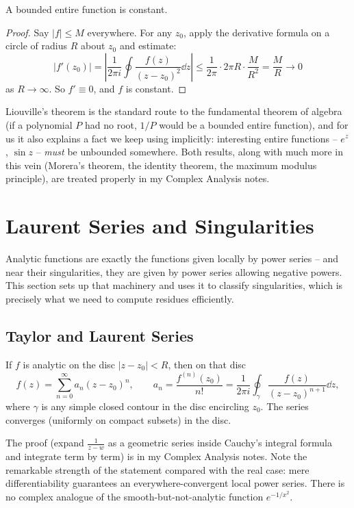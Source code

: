 \begin{theorem}
	A bounded entire function is constant.
\end{theorem}
\begin{proof}
	Say $|f| \leq M$ everywhere. For any $z_0$, apply the derivative formula on a circle of radius $R$ about $z_0$ and estimate:
	$$
	|f'(z_0)| = \left|\frac{1}{2\pi i} \oint \frac{f(z)}{(z - z_0)^2} \dd z\right| \leq \frac{1}{2\pi} \cdot 2\pi R \cdot \frac{M}{R^2} = \frac MR \to 0
	$$
	as $R \to \infty$. So $f' \equiv 0$, and $f$ is constant.
\end{proof}

Liouville's theorem is the standard route to the fundamental theorem of algebra (if a polynomial $P$ had no root, $1/P$ would be a bounded entire function), and for us it also explains a fact we keep using implicitly: interesting entire functions -- $e^z$, $\sin z$ -- \emph{must} be unbounded somewhere. Both results, along with much more in this vein (Morera's theorem, the identity theorem, the maximum modulus principle), are treated properly in my Complex Analysis notes.

\section{Laurent Series and Singularities}

Analytic functions are exactly the functions given locally by power series -- and near their singularities, they are given by power series allowing negative powers. This section sets up that machinery and uses it to classify singularities, which is precisely what we need to compute residues efficiently.

\subsection{Taylor and Laurent Series}

\begin{theorem}
	If $f$ is analytic on the disc $|z - z_0| < R$, then on that disc
	$$
	f(z) = \sum_{n = 0}^\infty a_n (z - z_0)^n, \qquad a_n = \frac{f^{(n)}(z_0)}{n!} = \frac{1}{2\pi i}\oint_\gamma \frac{f(z)}{(z - z_0)^{n+1}} \dd z,
	$$
	where $\gamma$ is any simple closed contour in the disc encircling $z_0$. The series converges (uniformly on compact subsets) in the disc.
\end{theorem}

The proof (expand $\frac{1}{z - w}$ as a geometric series inside Cauchy's integral formula and integrate term by term) is in my Complex Analysis notes. Note the remarkable strength of the statement compared with the real case: mere differentiability guarantees an everywhere-convergent local power series. There is no complex analogue of the smooth-but-not-analytic function $e^{-1/x^2}$.

